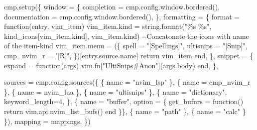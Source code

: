 \documentclass[
  letterpaper,
  DIV=11,
  numbers=noendperiod,
  oneside]{scrartcl}
\newenvironment{Shaded}{\begin{snugshade}}{\end{snugshade}}
\newcommand{\ControlFlowTok}[1]{\textcolor[rgb]{0.00,0.23,0.31}{#1}}
\newcommand{\ErrorTok}[1]{\textcolor[rgb]{0.68,0.00,0.00}{#1}}
\newcommand{\ExtensionTok}[1]{\textcolor[rgb]{0.00,0.23,0.31}{#1}}
\newcommand{\FunctionTok}[1]{\textcolor[rgb]{0.28,0.35,0.67}{#1}}
\newcommand{\KeywordTok}[1]{\textcolor[rgb]{0.00,0.23,0.31}{#1}}
\newcommand{\NormalTok}[1]{\textcolor[rgb]{0.00,0.23,0.31}{#1}}
\newcommand{\PreprocessorTok}[1]{\textcolor[rgb]{0.68,0.00,0.00}{#1}}
\newcommand{\SpecialStringTok}[1]{\textcolor[rgb]{0.13,0.47,0.30}{#1}}
\newcommand{\StringTok}[1]{\textcolor[rgb]{0.13,0.47,0.30}{#1}}
\begin{document}
\begin{Shaded}
\begin{Highlighting}[]
\ExtensionTok{cmp.setup}\ErrorTok{(}\KeywordTok{\{}
\ExtensionTok{window}\NormalTok{ = \{}
    \ExtensionTok{completion}\NormalTok{ = cmp.config.window.bordered}\ErrorTok{(}\KeywordTok{)}\ExtensionTok{,}
    \ExtensionTok{documentation}\NormalTok{ = cmp.config.window.bordered}\ErrorTok{(}\KeywordTok{)}\ExtensionTok{,}
  \ExtensionTok{\},}
\ExtensionTok{formatting}\NormalTok{ = \{}
\ExtensionTok{format}\NormalTok{ = function}\ErrorTok{(}\ExtensionTok{entry,}\NormalTok{ vim\_item}\KeywordTok{)}
      \ExtensionTok{vim\_item.kind}\NormalTok{ = string.format}\ErrorTok{(}\StringTok{"\%s \%s"}\ExtensionTok{,}\NormalTok{ kind\_icons}\PreprocessorTok{[}\SpecialStringTok{vim\_item.kind}\PreprocessorTok{]}\NormalTok{, vim\_item.kind}\KeywordTok{)} \ExtensionTok{{-}{-}Concatonate}\NormalTok{ the icons with name of the item{-}kind}
      \ExtensionTok{vim\_item.menu}\NormalTok{ = }\ErrorTok{(}\KeywordTok{\{}
        \ExtensionTok{spell}\NormalTok{ = }\StringTok{"[Spellings]"}\NormalTok{,}
        \ExtensionTok{ultisnips}\NormalTok{ = }\StringTok{"[Snip]"}\NormalTok{,}
        \ExtensionTok{cmp\_nvim\_r}\NormalTok{ = }\StringTok{"[R]"}\NormalTok{,}
      \KeywordTok{\})}\ExtensionTok{[entry.source.name]}
      \ControlFlowTok{return} \ExtensionTok{vim\_item}
    \ExtensionTok{end,}
    \ExtensionTok{\},}
  \ExtensionTok{snippet}\NormalTok{ = \{}
    \FunctionTok{expand}\NormalTok{ = function}\ErrorTok{(}\ExtensionTok{args}\KeywordTok{)}
      \ExtensionTok{vim.fn[}\StringTok{"UltiSnips\#Anon"}\ExtensionTok{]}\ErrorTok{(}\ExtensionTok{args.body}\KeywordTok{)} 
    \ExtensionTok{end,}
  \ExtensionTok{\},}

\ExtensionTok{sources}\NormalTok{ = cmp.config.sources}\ErrorTok{(}\KeywordTok{\{}
    \KeywordTok{\{} \ExtensionTok{name}\NormalTok{ = }\StringTok{"nvim\_lsp"}\NormalTok{ \},}
    \KeywordTok{\{} \ExtensionTok{name}\NormalTok{ = }\StringTok{\textquotesingle{}cmp\_nvim\_r\textquotesingle{}}\NormalTok{ \},}
    \KeywordTok{\{} \ExtensionTok{name}\NormalTok{ = }\StringTok{\textquotesingle{}nvim\_lua\textquotesingle{}}\NormalTok{ \},}
    \KeywordTok{\{} \ExtensionTok{name}\NormalTok{ = }\StringTok{"ultisnips"}\NormalTok{ \},}
    \KeywordTok{\{} \ExtensionTok{name}\NormalTok{ = }\StringTok{"dictionary"}\NormalTok{, keyword\_length=4, \},}
    \KeywordTok{\{} \ExtensionTok{name}\NormalTok{ = }\StringTok{"buffer"}\NormalTok{, option = \{ get\_bufnrs = function}\ErrorTok{(}\KeywordTok{)}
      \ControlFlowTok{return} \FunctionTok{vim.api.nvim\_list\_bufs()}
    \ExtensionTok{end}
    \ExtensionTok{\}\},}
    \KeywordTok{\{} \ExtensionTok{name}\NormalTok{ = }\StringTok{"path"}\NormalTok{ \},}
    \KeywordTok{\{} \ExtensionTok{name}\NormalTok{ = }\StringTok{"calc"}\NormalTok{ \}}
  \KeywordTok{\}}\ErrorTok{)}\ExtensionTok{,}
  \ExtensionTok{mapping}\NormalTok{ = mappings,}
\KeywordTok{\}}\ErrorTok{)}


\end{Highlighting}
\end{Shaded}
\end{document}

